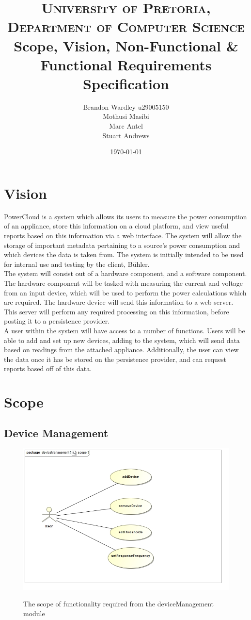 \documentclass[paper=a4, fontsize=11pt]{scrartcl} %
\title {
	\normalfont \normalsize 
	\textsc{University of Pretoria, Department of Computer Science} \\ [25pt]
	\huge Scope, Vision, Non-Functional \& Functional Requirements Specification\\
}
\author {
	Brandon Wardley u29005150 \\
	Mothusi Masibi \\
	Marc Antel \\
	Stuart Andrews \\
}
\date{\normalsize\today} %
\begin{document}
	\maketitle %
	\newpage
	\section{Vision}
	PowerCloud is a system which allows its users to measure the power consumption of an appliance, store this information on a cloud platform, and view useful reports based on this information via a web interface. The system will allow the storage of important metadata pertaining to a source's power consumption and which devices the data is taken from. The system is initially intended to be used for internal use and testing by the client, Bühler.\\
	
	The system will consist out of a hardware component, and a software component. The hardware component will be tasked with measuring the current and voltage from an input device, which will be used to perform the power calculations which are required. The hardware device will send this information to a web server. This server will perform any required processing on this information, before posting it to a persistence provider.\\
	
	A user within the system will have access to a number of functions. Users will be able to add and set up new devices, adding to the system, which will send data based on readings from the attached appliance. Additionally, the user can view the data once it has be stored on the persistence provider, and can request reports based off of this data.
	\newpage
	\section{Scope}
	\subsection{Device Management}
		\begin{figure}[H]
			\includegraphics[width=\textwidth]{images/deviceManagementScope.jpg}  \\
			\caption{The scope of functionality required from the deviceManagement module}
		\end{figure}
		
\end{document}
